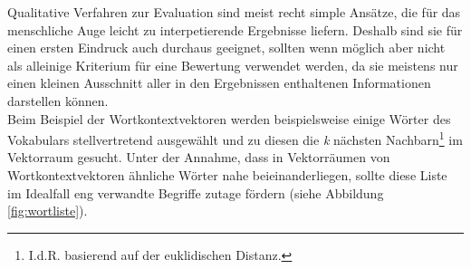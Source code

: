   Qualitative Verfahren zur Evaluation sind meist recht simple Ansätze, die für das menschliche
  Auge leicht zu interpetierende Ergebnisse liefern. Deshalb sind sie für einen ersten Eindruck
  auch durchaus geeignet, sollten wenn möglich aber nicht als alleinige Kriterium für eine Bewertung
  verwendet werden, da sie meistens nur einen kleinen Ausschnitt aller in den Ergebnissen enthaltenen
  Informationen darstellen können. \\
  Beim Beispiel der Wortkontextvektoren werden beispielsweise einige Wörter des Vokabulars stellvertretend ausgewählt
  und zu diesen die \emph{k} nächsten Nachbarn\footnote{I.d.R. basierend auf der euklidischen Distanz.} im Vektorraum gesucht.
  Unter der Annahme, dass in Vektorräumen von Wortkontextvektoren ähnliche Wörter nahe beieinanderliegen, sollte diese Liste
  im Idealfall eng verwandte Begriffe zutage fördern (siehe Abbildung \ref{fig:wortliste}).\\

